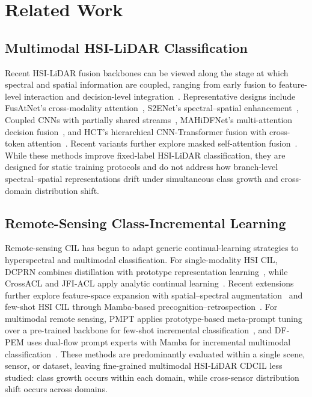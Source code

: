 \section{Related Work}
\label{sec:related}

\subsection{Multimodal HSI-LiDAR Classification}

Recent HSI-LiDAR fusion backbones can be viewed along the stage at which spectral and spatial information are coupled, ranging from early fusion to feature-level interaction and decision-level integration~\cite{mohla2020fusatnet,fang2022s2enet,hang2020coupled,li2022mahidfnet,ghosh2023hct}.
Representative designs include FusAtNet's cross-modality attention~\cite{mohla2020fusatnet}, S2ENet's spectral--spatial enhancement~\cite{fang2022s2enet}, Coupled CNNs with partially shared streams~\cite{hang2020coupled}, MAHiDFNet's multi-attention decision fusion~\cite{li2022mahidfnet}, and HCT's hierarchical CNN-Transformer fusion with cross-token attention~\cite{ghosh2023hct}.
Recent variants further explore masked self-attention fusion~\cite{shi2025msafn}.
While these methods improve fixed-label HSI-LiDAR classification, they are designed for static training protocols and do not address how branch-level spectral--spatial representations drift under simultaneous class growth and cross-domain distribution shift.

\subsection{Remote-Sensing Class-Incremental Learning}

Remote-sensing CIL has begun to adapt generic continual-learning strategies to hyperspectral and multimodal classification.
For single-modality HSI CIL, DCPRN combines distillation with prototype representation learning~\cite{deng2024dcprn}, while CrossACL and JFI-ACL apply analytic continual learning~\cite{xu2025crossacl,zhang2024jfi_acl}.
Recent extensions further explore feature-space expansion with spatial--spectral augmentation~\cite{feica2025} and few-shot HSI CIL through Mamba-based precognition--retrospection~\cite{hyperpret2026}.
For multimodal remote sensing, PMPT applies prototype-based meta-prompt tuning over a pre-trained backbone for few-shot incremental classification~\cite{yang2026pmpt}, and DF-PEM uses dual-flow prompt experts with Mamba for incremental multimodal classification~\cite{li2026dfpem}.
These methods are predominantly evaluated within a single scene, sensor, or dataset, leaving fine-grained multimodal HSI-LiDAR CDCIL less studied: class growth occurs within each domain, while cross-sensor distribution shift occurs across domains.

